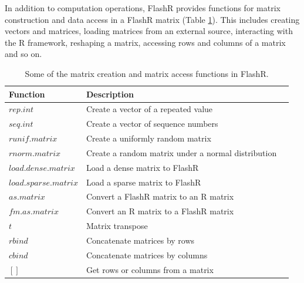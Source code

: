 In addition to computation operations, FlashR provides functions for matrix
construction and data access in a FlashR matrix (Table \ref{tbl:utility}). This
includes creating vectors and matrices, loading matrices from an external source,
interacting with the R framework, reshaping a matrix, accessing rows and columns of
a matrix and so on.


\begin{table}
\begin{center}
\caption{Some of the matrix creation and matrix access functions in FlashR.}
\vspace{-10pt}
\footnotesize
\begin{tabular}{|l|l|l|}
\hline
Function & Description \\
\hline
$rep.int$ & Create a vector of a repeated value \\
$seq.int$ & Create a vector of sequence numbers \\
$runif.matrix$ & Create a uniformly random matrix  \\
$rnorm.matrix$ & Create a random matrix under a normal distribution \\
\hline
$load.dense.matrix$ & Load a dense matrix to FlashR \\
$load.sparse.matrix$ & Load a sparse matrix to FlashR \\
\hline
$as.matrix$ & Convert a FlashR matrix to an R matrix \\
$fm.as.matrix$ & Convert an R matrix to a FlashR matrix \\
\hline
$t$ & Matrix transpose \\
$rbind$ & Concatenate matrices by rows \\
$cbind$ & Concatenate matrices by columns \\
$[]$ & Get rows or columns from a matrix \\
\hline
\end{tabular}
\normalsize
\label{tbl:utility}
\end{center}
\end{table}


